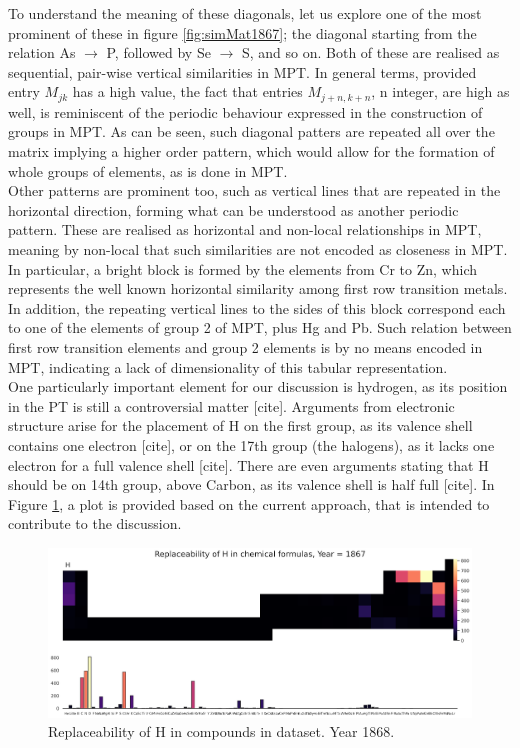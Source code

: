\documentclass[article]{article}
\begin{document}
To understand the meaning of these diagonals, let us explore one of the most prominent of these in figure \ref{fig:simMat1867}; the diagonal starting from the relation As $\rightarrow$ P, followed by Se $\rightarrow$ S, and so on. Both of these are realised as sequential, pair-wise vertical similarities in MPT. In general terms, provided entry $M_{jk}$ has a high value, the fact that entries $M_{j+n,k+n}$, n integer, are high as well, is reminiscent of the periodic behaviour expressed in the construction of groups in MPT. As can be seen, such diagonal patters are repeated all over the matrix implying a higher order pattern, which would allow for the formation of whole groups of elements, as is done in MPT.\\

Other patterns are prominent too, such as vertical lines that are repeated in the horizontal direction, forming what can be understood as another periodic pattern. These are realised as horizontal and non-local relationships in MPT, meaning by non-local that such similarities are not encoded as closeness in MPT. In particular, a bright block is formed by the elements from Cr to Zn, which represents the well known horizontal similarity among first row transition metals. In addition, the repeating vertical lines to the sides of this block correspond each to one of the elements of group 2 of MPT, plus Hg and Pb. Such relation between first row transition elements and group 2 elements is by no means encoded in MPT, indicating a lack of dimensionality of this tabular representation.\\

One particularly important element for our discussion is hydrogen, as its position in the PT is still a controversial matter [cite]. Arguments from electronic structure arise for the placement of H on the first group, as its valence shell contains one electron [cite], or on the 17th group (the halogens), as it lacks one electron for a full valence shell [cite]. There are even arguments stating that H should be on 14th group, above Carbon, as its valence shell is half full [cite]. In Figure \ref{fig:repH}, a plot is provided based on the current approach, that is intended to contribute to the discussion. 

\begin{figure}[h!]
  \centering
	\includegraphics[width=13.0cm]{replace_H.png}
	\caption{Replaceability of H in compounds in dataset. Year 1868.}
	\label{fig:repH}
\end{figure}
\end{document}
